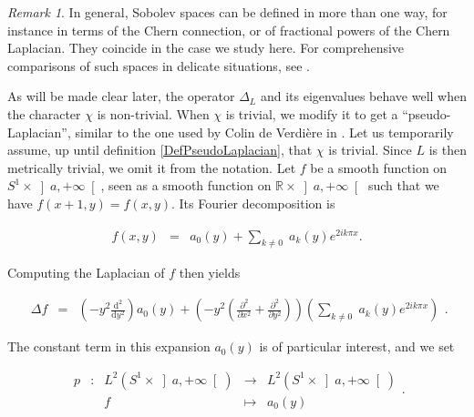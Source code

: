 \documentclass{jams-l}
\theoremstyle{definition}
\theoremstyle{remark}
\newtheorem{remark}[theorem]{Remark}
\numberwithin{equation}{section}
\begin{document}
        \begin{remark}
        
            In general, Sobolev spaces can be defined in more than one way, for instance in terms of the Chern connection, or of fractional powers of the Chern Laplacian. They coincide in the case we study here. For comprehensive comparisons of such spaces in delicate situations, see \cite{MR2343536}.
        
        \end{remark}
        
        As will be made clear later, the operator $\Delta_L$ and its eigenvalues behave well when the character $\chi$ is non-trivial. When $\chi$ is trivial, we modify it to get a ``pseudo-Laplacian'', similar to the one used by Colin de Verdière in \cite{MR688031, MR699488}. Let us temporarily assume, up until definition \ref{DefPseudoLaplacian}, that $\chi$ is trivial. Since $L$ is then metrically trivial, we omit it from the notation. Let $f$ be a smooth function on $S^1 \times \left] a, +\infty \right[$, seen as a smooth function on $\mathbb{R} \times \left] a, + \infty \right[$ such that we have $f \left( x+1, y \right) = f \left( x,y \right)$. Its Fourier decomposition is
        
        
        \[ \begin{array}{lll}
                f \left( x, y \right) & = & a_0 \left( y \right) + \sum\limits_{k \neq 0} \; a_k \left( y \right) e^{2 i k \pi x}.
            \end{array} \]
        
        \noindent Computing the Laplacian of $f$ then yields
        
        \[ \begin{array}{lll}
                \Delta f & = & \left( - y^2 \frac{\mathrm{d}^2}{\mathrm{d}y^2} \right) a_0 \left( y \right) + \left( - y^2 \left( \frac{\partial^2}{\partial x^2} + \frac{\partial^2}{\partial y^2} \right) \right) \left( \sum\limits_{k \neq 0} \; a_k \left( y \right) e^{2 i k \pi x} \right)
            \end{array} . \]
        
        \noindent The constant term in this expansion $a_0 \left( y \right)$ is of particular interest, and we set
        
        \[ \begin{array}{lllll}
                p & : & L^2 \left( S^1 \times \left] a, + \infty \right[ \right) & \longrightarrow & L^2 \left( S^1 \times \left] a, + \infty \right[ \right) \\[0.5em]
                
                && f & \longmapsto & a_0 \left( y \right)
            \end{array} . \]
        
\end{document}
